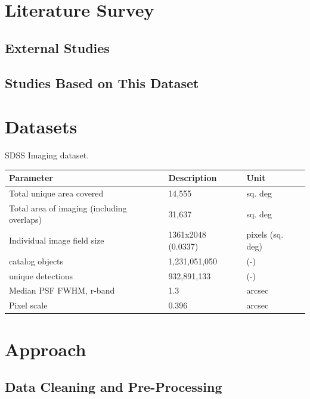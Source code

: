 \documentclass[11pt,sigconf]{acmart}
\begin{document}
\section{Literature Survey}

\subsection{External Studies}

\subsection{Studies Based on This Dataset}




\section{Datasets}

SDSS Imaging dataset.
\\

\begin{table}[]
  \begin{tabular}{ |p{3cm}|p{2.8cm}|p{1.6cm}|  } \hline
   Parameter & Description & Unit  \\ \hline
   Total unique area covered & 14,555  & sq. deg \\ \hline
   Total area of imaging (including overlaps) & 31,637 & sq. deg \\ \hline
   Individual image field size & 1361x2048 (0.0337) & pixels (sq. deg) \\ \hline
   catalog objects & 1,231,051,050 & (-) \\ \hline
   unique detections & 932,891,133 & (-) \\ \hline
   Median PSF FWHM, r-band & 1.3 & arcsec \\ \hline
   Pixel scale & 0.396 & arcsec \\ \hline
  \end{tabular}
  \end{table}

\section{Approach}

\subsection{Data Cleaning and Pre-Processing}
\end{document}
